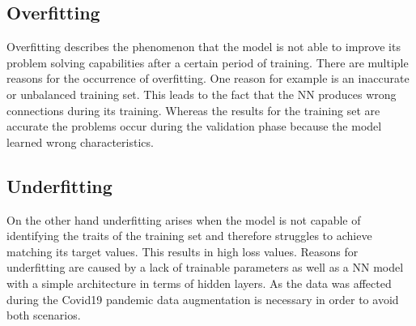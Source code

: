 \subsection{Overfitting}

Overfitting describes the phenomenon that the model is not able to improve its problem solving capabilities after a certain period of training. There are multiple reasons for the occurrence of overfitting. One reason for example is an inaccurate or unbalanced training set. This leads to the fact that the NN produces wrong connections during its training.  Whereas the results for the training set are accurate the problems  occur during the validation phase because the model learned wrong characteristics. \cite{fitting} 
\subsection{Underfitting}
On the other hand underfitting arises when the model is not capable of identifying the traits of the training set and therefore struggles to achieve matching its target values. This results in high loss values. Reasons for underfitting are caused by a lack of trainable parameters as well as a NN model with a simple architecture in terms of hidden layers. \cite{fitting} 
\newline
\newline
As the data was affected during the Covid19 pandemic data augmentation is necessary in order to avoid both scenarios.

